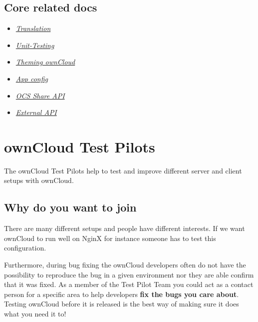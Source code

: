 \documentclass[letterpaper,10pt,english]{sphinxmanual}
\begin{document}
\subsection{Core related docs}
\label{core/index:core-related-docs}\begin{itemize}
\item {} 
{\hyperref[core/translation::doc]{\emph{\emph{Translation}}}}

\item {} 
{\hyperref[core/unit\string-testing::doc]{\emph{\emph{Unit-Testing}}}}

\item {} 
{\hyperref[core/theming::doc]{\emph{\emph{Theming ownCloud}}}}

\item {} 
{\hyperref[core/configfile::doc]{\emph{\emph{App config}}}}

\item {} 
{\hyperref[core/ocs\string-share\string-api::doc]{\emph{\emph{OCS Share API}}}}

\item {} 
{\hyperref[core/externalapi::doc]{\emph{\emph{External API}}}}

\end{itemize}


\section{ownCloud Test Pilots}
\label{testing/index:owncloud-test-pilots}\label{testing/index::doc}
The ownCloud Test Pilots help to test and improve different server and client setups with ownCloud.


\subsection{Why do you want to join}
\label{testing/index:why-do-you-want-to-join}
There are many different setups and people have different interests. If we want ownCloud to run well on NginX for instance someone has to test this configuration.

Furthermore, during bug fixing the ownCloud developers often do not have the possibility to reproduce the bug in a given environment nor they are able confirm that it was fixed. As a member of the Test Pilot Team you could act as a contact person for a specific area to help developers \textbf{fix the bugs you care about}. Testing ownCloud before it is released is the best way of making sure it does what you need it to!
\end{document}
